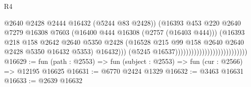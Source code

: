 \begin{lexlean}{R4}
\begin{coremodule}
                                                            @2640
                                                            @2428
                                                            @2444
                                                            @16432
                                                            (@5244 @83 @2428))
                                                          (@16393
                                                            @453
                                                            @220
                                                            @2640
                                                            @7279
                                                            @16308
                                                            @7603
                                                            (@16400
                                                              @444
                                                              @16308
                                                              (@2757 (@16403 @444)))
                                                            (@16393
                                                              @218
                                                              @158
                                                              @2642
                                                              @2640
                                                              @5350
                                                              @2428
                                                              (@16528
                                                                @215
                                                                @99
                                                                @158
                                                                @2640
                                                                @2640
                                                                @2428
                                                                @5350
                                                                @16432
                                                                @5353)
                                                              @16432)))
                                                        (@5245 @16537)))))))))))))))))))))))))))
@16629 := fun (path : @2553) => fun (subject : @2553) => fun (cur : @2566) => @12195 @16625
@16631 := @6770 @2424 @1329
@16632 := @3463 @16631
@16633 := @2639 @16632

\end{coremodule}
\end{lexlean}
